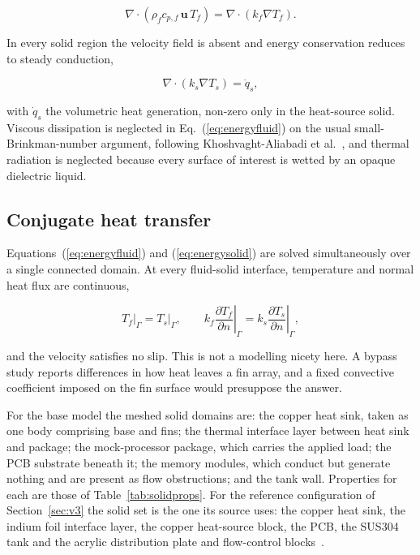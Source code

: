 \begin{equation}
\nabla \cdot \left( \rho_f c_{p,f} \, \mathbf{u} \, T_f \right)
= \nabla \cdot \left( k_f \nabla T_f \right) .
\label{eq:energyfluid}
\end{equation}

\noindent
In every solid region the velocity field is absent and energy conservation reduces to steady
conduction,

\begin{equation}
\nabla \cdot \left( k_s \nabla T_s \right) = \dot{q}_s ,
\label{eq:energysolid}
\end{equation}

\noindent
with $\dot{q}_s$ the volumetric heat generation, non-zero only in the heat-source solid.
Viscous dissipation is neglected in Eq.~(\ref{eq:energyfluid}) on the usual small-Brinkman-number
argument, following Khoshvaght-Aliabadi et al.~\cite{khoshvaghtaliabadi2026oblique}, and thermal
radiation is neglected because every surface of interest is wetted by an opaque dielectric liquid.

\subsection{Conjugate heat transfer}
\label{sec:cht}

Equations~(\ref{eq:energyfluid}) and (\ref{eq:energysolid}) are solved simultaneously over a single
connected domain. At every fluid-solid interface, temperature and normal heat flux are continuous,

\begin{equation}
T_f \big|_{\Gamma} = T_s \big|_{\Gamma} ,
\qquad
\left. k_f \frac{\partial T_f}{\partial n} \right|_{\Gamma}
= \left. k_s \frac{\partial T_s}{\partial n} \right|_{\Gamma} ,
\label{eq:cht}
\end{equation}

\noindent
and the velocity satisfies no slip. This is not a modelling nicety here. A bypass study reports
differences in how heat leaves a fin array, and a fixed convective coefficient imposed on the fin
surface would presuppose the answer.

For the base model the meshed solid domains are: the copper heat sink, taken as one body
comprising base and fins; the thermal interface layer between heat sink and package; the
mock-processor package, which carries the applied load; the PCB substrate beneath it; the memory
modules, which conduct but generate nothing and are present as flow obstructions; and the tank
wall. Properties for each are those of Table~\ref{tab:solidprops}. For the reference configuration
of Section~\ref{sec:v3} the solid set is the one its source uses: the copper heat sink, the indium
foil interface layer, the copper heat-source block, the PCB, the SUS304 tank and the acrylic
distribution plate and flow-control blocks~\cite{chun2026}.

